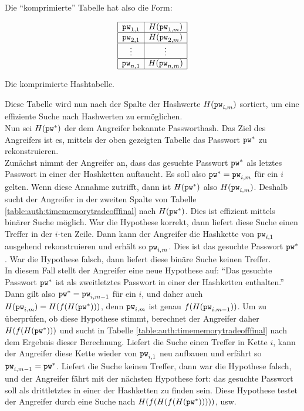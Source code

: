 Die "`komprimierte"' Tabelle hat also die Form:
\begin{table}[h]
	\begin{equation*}
		\begin{array}{|c|c|}
			\hline
			\texttt{pw}_{1,1} & H(\texttt{pw}_{1,m})\\\hline
			\texttt{pw}_{2,1} & H(\texttt{pw}_{2,m})\\\hline
			\vdots & \vdots \\\hline
			\texttt{pw}_{n,1} & H(\texttt{pw}_{n,m})\\\hline
		\end{array}
	\end{equation*}
	\caption{Die komprimierte Hashtabelle.}
	\label{table:auth:timememorytradeofffinal}
\end{table}

Diese Tabelle wird nun nach der Spalte der Hashwerte $H(\texttt{pw}_{i,m})$ sortiert, um eine effiziente Suche nach Hashwerten zu ermöglichen.\\

Nun sei $H(\texttt{pw}^*)$ der dem Angreifer bekannte Passworthash. Das Ziel des Angreifers ist es, mittels der oben gezeigten Tabelle das Passwort $\texttt{pw}^*$ zu rekonstruieren.\\

Zunächst nimmt der Angreifer an, dass das gesuchte Passwort $\texttt{pw}^*$ als letztes Passwort in einer der Hashketten auftaucht.
Es soll also $\texttt{pw}^* = \texttt{pw}_{i,m}$ für ein $i$ gelten.
Wenn diese Annahme zutrifft, dann ist $H(\texttt{pw}^*)$ also $H(\texttt{pw}_{i,m})$. Deshalb sucht der Angreifer in der zweiten Spalte von Tabelle \ref{table:auth:timememorytradeofffinal} nach $H(\texttt{pw}^*)$. Dies ist effizient mittels binärer Suche möglich.
War die Hypothese korrekt, dann liefert diese Suche einen Treffer in der $i$-ten Zeile. Dann kann der Angreifer die Hashkette von $\texttt{pw}_{i,1}$ ausgehend rekonstruieren und erhält so $\texttt{pw}_{i,m}$. Dies ist das gesuchte Passwort $\texttt{pw}^*$. War die Hypothese falsch, dann liefert diese binäre Suche keinen Treffer.\\

In diesem Fall stellt der Angreifer eine neue Hypothese auf: "`Das gesuchte Passwort $\texttt{pw}^*$ ist als zweitletztes Passwort in einer der Hashketten enthalten."'
Dann gilt also $\texttt{pw}^* = \texttt{pw}_{i,m-1}$ für ein $i$, und daher auch $H(\texttt{pw}_{i,m}) = H(f(H(\texttt{pw}^*)))$, denn $\texttt{pw}_{i,m}$ ist genau $f(H(\texttt{pw}_{i,m-1}))$.
Um zu überprüfen, ob diese Hypothese stimmt, berechnet der Angreifer daher $H(f(H(\texttt{pw}^*)))$ und sucht in Tabelle \ref{table:auth:timememorytradeofffinal} nach dem Ergebnis dieser Berechnung.
Liefert die Suche einen Treffer in Kette $i$, kann der Angreifer diese Kette wieder von $\texttt{pw}_{i,1}$ neu aufbauen und erfährt so $\texttt{pw}_{i,m-1} = \texttt{pw}^*$.
Liefert die Suche keinen Treffer, dann war die Hypothese falsch, und der Angreifer fährt mit der nächsten Hypothese fort: das gesuchte Passwort soll als drittletztes in einer der Hashketten zu finden sein.
Diese Hypothese testet der Angreifer durch eine Suche nach $H(f(H(f(H(\texttt{pw}^*)))))$, usw.

